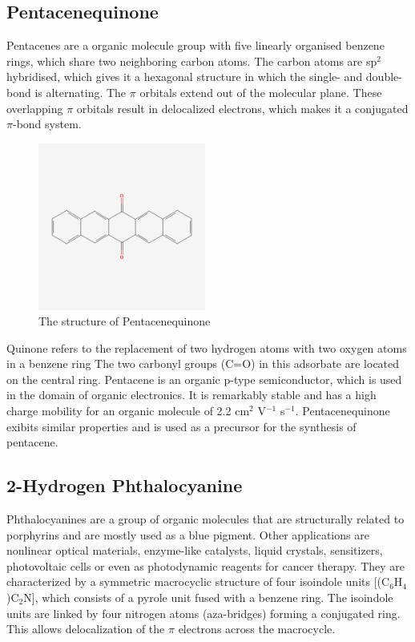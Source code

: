 \subsection{Pentacenequinone}
Pentacenes are a organic molecule group with five linearly organised benzene rings, which share two neighboring carbon atoms.
The carbon atoms are sp$^2$ hybridised, which gives it a hexagonal structure in which the single- and double-bond is alternating.
The $\pi$ orbitals extend out of the molecular plane.
These overlapping  $\pi$ orbitals result in delocalized electrons, which makes it a conjugated $\pi$-bond system. \\
\begin{figure}
    \centering
    \includegraphics[width=0.49\textwidth]{graphics/6,13-Pentacenequinone.png}
    \caption{The structure of Pentacenequinone  \cite{pentacenequinone}}
    \label{fig:penta}
\end{figure}
\noindent Quinone refers to the replacement of two hydrogen atoms with two oxygen atoms in a benzene ring %
The two carbonyl groups (C=O) in this adsorbate are located on the central ring.
Pentacene is an organic p-type semiconductor, which is used in the domain of organic electronics.
It is remarkably stable and has a high charge mobility for an organic molecule of 2.2 cm$^2$ V$^{-1}$ s$^{-1}$. \cite{MOTA2018511}
Pentacenequinone exibits similar properties and is used as a precursor for the synthesis of pentacene. \\

\newpage
\subsection{2-Hydrogen Phthalocyanine}
Phthalocyanines are a group of organic molecules that are structurally related to porphyrins and are mostly used as a blue pigment. \cite{thomas1990phthalocyanine}
Other applications are nonlinear optical materials, enzyme-like catalysts, liquid crystals, sensitizers, photovoltaic cells or even as photodynamic reagents for cancer therapy. \cite{wang2012structures}
They are characterized by a symmetric macrocyclic structure of four isoindole units [(C$_6$H$_4$)C$_2$N], which consists of a pyrole unit fused with a benzene ring. 
The isoindole units are linked by four nitrogen atoms (aza-bridges) forming a conjugated ring.
This allows delocalization of the $\pi$ electrons across the macrocycle.



